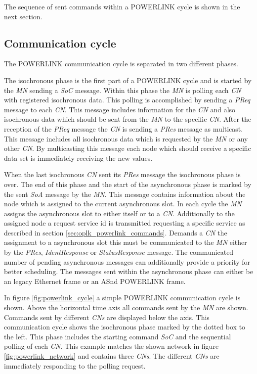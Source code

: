 The sequence of sent commands within a POWERLINK cycle is shown in the next section.

\subsection{Communication cycle}
\label{sec:oplk_powerlink_commcycle}

The POWERLINK communication cycle is separated in two different phases.

The isochronous phase is the first part of a POWERLINK cycle and is started by the \emph{MN} sending a \emph{SoC} message.
Within this phase the \emph{MN} is polling each \emph{CN} with registered isochronous data.
This polling is accomplished by sending a \emph{PReq} message to each \emph{CN}.
This message includes information for the \emph{CN} and also isochronous data which should be sent from the \emph{MN} to the specific \emph{CN}.
After the reception of the \emph{PReq} message the \emph{CN} is sending a \emph{PRes} message as multicast.
This message includes all isochronous data which is requested by the \emph{MN} or any other \emph{CN}.
By multicasting this message each node which should receive a specific data set is immediately receiving the new values. \cite[section 4.2.4.1.1]{epsg_epsg_2013}

When the last isochronous \emph{CN} sent its \emph{PRes} message the isochronous phase is over.
The end of this phase and the start of the asynchronous phase is marked by the sent \emph{SoA} message by the \emph{MN}.
This message contains information about the node which is assigned to the current asynchronous slot.
In each cycle the \emph{MN} assigns the asynchronous slot to either itself or to a \emph{CN}.
Additionally to the assigned node a request service id is transmitted requesting a specific service as described in section \ref{sec:oplk_powerlink_commands}.
Demands a \emph{CN} the assignment to a asynchronous slot this must be communicated to the \emph{MN} either by the \emph{PRes}, \emph{IdentResponse} or \emph{StatusResponse} message.
The communicated number of pending asynchronous messages can additionally provide a priority for better scheduling.
The messages sent within the asynchronous phase can either be an legacy Ethernet frame or an ASnd POWERLINK frame. \cite[section 4.2.4.1.2]{epsg_epsg_2013}

In figure \ref{fig:powerlink_cycle} a simple POWERLINK communication cycle is shown.
Above the horizontal time axis all commands sent by the \emph{MN} are shown.
Commands sent by different \emph{CNs} are displayed below the axis.
This communication cycle shows the isochronous phase marked by the dotted box to the left.
This phase includes the starting command \emph{SoC} and the sequential polling of each \emph{CN}.
This example matches the shown network in figure \ref{fig:powerlink_network} and contains three \emph{CNs}.
The different \emph{CNs} are immediately responding to the polling request.

